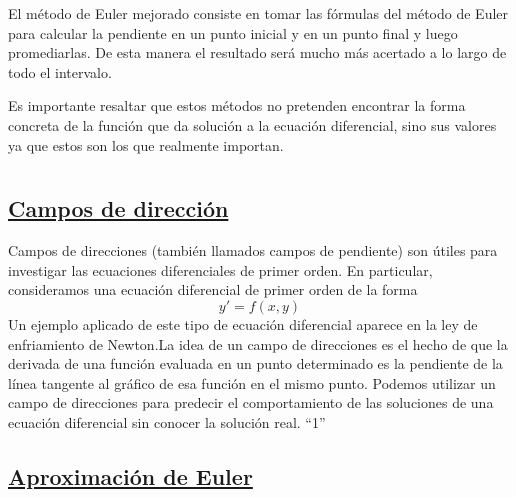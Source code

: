 \documentclass[12 pt,letterpaper]{article}
\newcommand{\bibTitle}[1]{``#1''}
\begin{document}
	El método de Euler mejorado consiste en tomar las fórmulas del método de Euler para calcular la pendiente en un punto inicial y en un punto final y luego promediarlas. De esta manera el resultado será mucho más acertado a lo largo de todo el intervalo.\vspace{0.4Cm}
	
	Es importante resaltar que estos métodos no pretenden encontrar la forma concreta de la función que da solución a la ecuación diferencial, sino sus valores ya que estos son los que realmente importan.\vspace{0.4Cm}
\newpage
	
	
	\flushleft\section{\fbox{\textcolor{violet}{Aplicaciones}}}
	
	
	\flushleft\subsection{\underline{Campos de dirección}}\vspace{0.5cm}
	
	
	\begin{enumerate}
	\justify
    Campos de direcciones (también llamados campos de pendiente) son útiles para investigar las ecuaciones diferenciales de primer orden. En particular, consideramos una ecuación diferencial de primer orden de la forma\[y'=f(x,y)\]Un ejemplo aplicado de este tipo de ecuación diferencial aparece en la ley de enfriamiento de Newton.La idea de un campo de direcciones es el hecho de que la derivada de una función evaluada en un punto determinado es la pendiente de la línea tangente al gráfico de esa función en el mismo punto. Podemos utilizar un campo de direcciones para predecir el comportamiento de las soluciones de una ecuación diferencial sin conocer la solución real. \bibTitle{1}
		
	\end{enumerate} 
	
	
	\flushleft\subsection{\underline{Aproximación de Euler}}\vspace{0.5cm}
	
\end{document}
